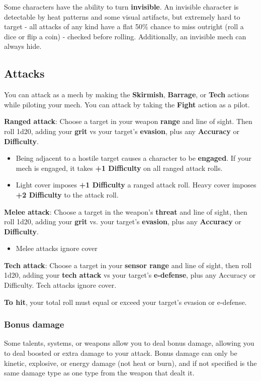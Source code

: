 Some characters have the ability to turn \textbf{invisible}. An invisible character is detectable by heat patterns and some visual artifacts, but extremely hard to target - all attacks of any kind have a flat 50\% chance to miss outright (roll a dice or flip a coin) - checked before rolling. Additionally, an invisible mech can always hide.


\subsection{Attacks}
You can attack as a mech by making the \textbf{Skirmish}, \textbf{Barrage}, or \textbf{Tech} actions while piloting your mech. You can attack by taking the \textbf{Fight} action as a pilot.

\textbf{Ranged attack}: Choose a target in your weapon \textbf{range} and line of sight. Then roll 1d20, adding your \textbf{grit} vs your target’s \textbf{evasion}, plus any \textbf{Accuracy} or \textbf{Difficulty}.
\begin{itemize}
     \item Being adjacent to a hostile target causes a character to be \textbf{engaged}. If your mech is engaged, it takes \textbf{+1 Difficulty} on all ranged attack rolls.
     \item Light cover imposes \textbf{+1 Difficulty} a ranged attack roll. Heavy cover imposes \textbf{+2 Difficulty} to the attack roll.
\end{itemize}
\textbf{Melee attack}: Choose a target in the weapon’s \textbf{threat} and line of sight, then roll 1d20, adding your \textbf{grit} vs. your target’s \textbf{evasion}, plus any \textbf{Accuracy} or \textbf{Difficulty}.
\begin{itemize}
     \item Melee attacks ignore cover
\end{itemize}
\textbf{Tech attack}: Choose a target in your \textbf{sensor range} and line of sight, then roll 1d20, adding your \textbf{tech attack} vs your target’s \textbf{e-defense}, plus any Accuracy or Difficulty. Tech attacks ignore cover.

\textbf{To hit}, your total roll must equal or exceed your target’s evasion or e-defense.


\subsubsection{Bonus damage}
Some talents, systems, or weapons allow you to deal bonus damage, allowing you to deal boosted or extra damage to your attack. Bonus damage can only be kinetic, explosive, or energy damage (not heat or burn), and if not specified is the same damage type as one type from the weapon that dealt it.


